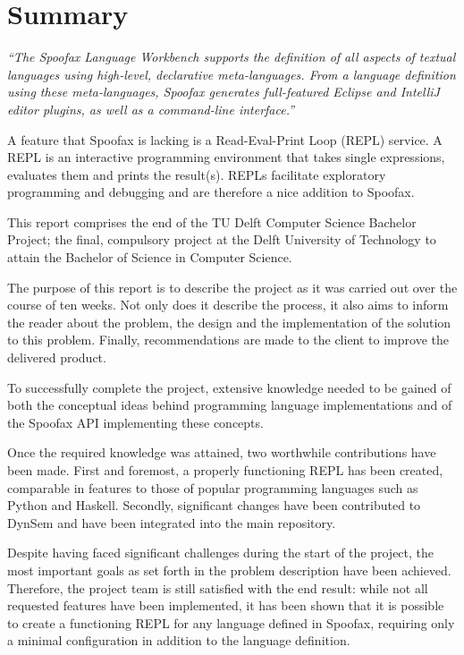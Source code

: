 \chapter{Summary}
\label{cha:summary}

\textit{``The Spoofax Language Workbench supports the definition of all aspects
of textual languages using high-level, declarative meta-languages. From a
language definition using these meta-languages, Spoofax generates full-featured
Eclipse and IntelliJ editor plugins, as well as a command-line interface.''}

A feature that Spoofax is lacking is a Read-Eval-Print Loop (REPL) service. A
REPL is an interactive programming environment that takes single expressions,
evaluates them and prints the result(s). REPLs facilitate exploratory
programming and debugging and are therefore a nice addition to Spoofax.

This report comprises the end of the TU Delft Computer Science Bachelor Project;
the final, compulsory project at the Delft University of Technology to attain
the Bachelor of Science in Computer Science.

The purpose of this report is to describe the project as it was carried out over
the course of ten weeks. Not only does it describe the process, it also aims to
inform the reader about the problem, the design and the implementation of the
solution to this problem. Finally, recommendations are made to the client to
improve the delivered product.

To successfully complete the project, extensive knowledge needed to be gained of
both the conceptual ideas behind programming language implementations and of the
Spoofax API implementing these concepts.

Once the required knowledge was attained, two worthwhile contributions have been
made. First and foremost, a properly functioning REPL has been created,
comparable in features to those of popular programming languages such as Python
and Haskell. Secondly, significant changes have been contributed to DynSem and
have been integrated into the main repository.

Despite having faced significant challenges during the start of the project, the
most important goals as set forth in the problem description have been achieved.
Therefore, the project team is still satisfied with the end result: while
not all requested features have been implemented, it has been shown that it is
possible to create a functioning REPL for any language defined in Spoofax,
requiring only a minimal configuration in addition to the language definition.

